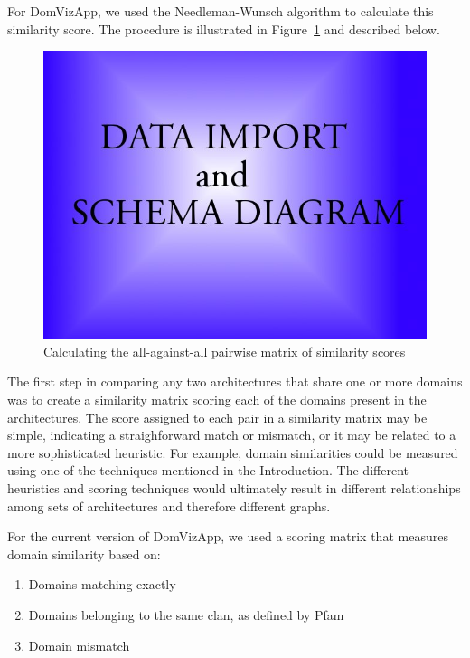 For DomVizApp, we used the Needleman-Wunsch algorithm \cite{nwalgo} to calculate this similarity score. The procedure is illustrated in Figure~\ref{computingscores} and described below. 

\begin{figure}[h]
 \begin{center}
 \includegraphics[scale=0.5]{figures/placeholder.jpg}
 \end{center}
 \caption{Calculating the all-against-all pairwise matrix of similarity scores}
 \label{computingscores}
\end{figure}

The first step in comparing any two architectures that share one or more domains was to create a similarity matrix scoring each of the domains present in the architectures. The score assigned to each pair in a similarity matrix may be simple, indicating a straighforward match or mismatch, or it may be related to a more sophisticated heuristic. For example, domain similarities could be measured using one of the techniques mentioned in the Introduction. The different heuristics and scoring techniques would ultimately result in different relationships among sets of architectures and therefore different graphs.

For the current version of DomVizApp, we used a scoring matrix that measures domain similarity based on:
\begin{enumerate}
	\item Domains matching exactly
	\item Domains belonging to the same clan, as defined by Pfam
	\item Domain mismatch
\end{enumerate}

